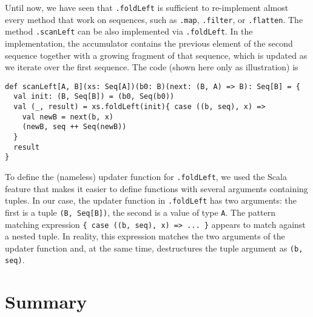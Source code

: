 Until now, we have seen that \lstinline!.foldLeft!
is sufficient to re-implement almost every method that work on sequences,
such as \lstinline!.map!,
\lstinline!.filter!, or
\lstinline!.flatten!. The
method \lstinline!.scanLeft!
can be also implemented via \lstinline!.foldLeft!.
In the implementation, the accumulator contains the previous element
of the second sequence together with a growing fragment of that sequence,
which is updated as we iterate over the first sequence. The code (shown
here only as illustration) is
\begin{lstlisting}
def scanLeft[A, B](xs: Seq[A])(b0: B)(next: (B, A) => B): Seq[B] = {
  val init: (B, Seq[B]) = (b0, Seq(b0))
  val (_, result) = xs.foldLeft(init){ case ((b, seq), x) =>
    val newB = next(b, x)
    (newB, seq ++ Seq(newB))
  }
  result
}
\end{lstlisting}
To define the (nameless) updater function for \lstinline!.foldLeft!,
we used the Scala feature that makes it easier to define functions
with several arguments containing tuples. In our case, the updater
function in \lstinline!.foldLeft!
has two arguments: the first is a tuple \lstinline!(B, Seq[B])!,
the second is a value of type \lstinline!A!.
The pattern matching expression \lstinline!{ case ((b, seq), x) => ... }!
appears to match against a nested tuple. In
reality, this expression matches the two arguments of the updater
function and, at the same time, destructures the tuple argument as
\lstinline!(b, seq)!. 

\section{Summary}

